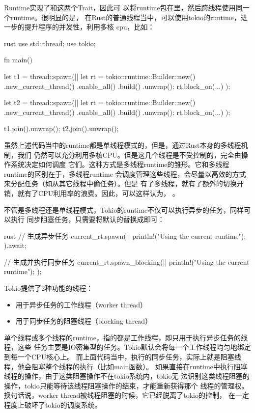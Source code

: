 Runtime实现了和这两个Trait，因此可
以将runtime包在里，然后跨线程使用同一个runtime。很明显的是，
在Rust的普通线程当中，可以使用tokio的runtime，进一步的提升程序的并发性，利用多核
cpu，比如：
\begin{code-block}{rust}
use std::thread;
use tokio;

fn main() {
    let t1 = thread::spawn(|| {
        let rt = tokio::runtime::Builder::new()
            .new_current_thread()
            .enable_all()
            .build()
            .unwrap();
        rt.block_on(...)
    });

    let t2 = thread::spawn(|| {
        let rt = tokio::runtime::Builder::new()
            .new_current_thread()
            .enable_all()
            .build()
            .unwrap();
        rt.block_on(...)
    });

    t1.join().unwrap();
    t2.join().unwrap();
}
\end{code-block}
虽然上述代码当中的runtime都是单线程模式的，但是，通过Rust本身的多线程机制，我们
仍然可以充分利用多核CPU。但是这几个线程是不受控制的，完全由操作系统决定如何调度
它们。这种方式是多线程runtime的雏形。它和多线程runtime的区别在于，多线程runtime
会调度管理这些线程，会尽量以高效的方式来分配任务（如从其它线程中偷任务）。但是
有了多线程，就有了额外的切换开销，就有了CPU利用率的浪费。因此，可以这样认为，
。

不管是多线程还是单线程模式，Tokio的runtime不仅可以执行异步的任务，同样可以执行
同步阻塞任务，只需要将默认的替换成即可：
\begin{code-block}{rust}
// 生成异步任务
current_rt.spawn(||{
    println!("Using the current runtime");
}).await;

// 生成并执行同步任务
current_rt.spawn_blocking(||{
    println!("Using the current runtime");
});
\end{code-block}

Tokio提供了2种功能的线程：
\begin{itemize}
  \item 用于异步任务的工作线程（worker thread）
  \item 用于同步任务的阻塞线程（blocking thread）
\end{itemize}

单个线程或多个线程的runtime，指的都是工作线程，即只用于执行异步任务的线程，这些
任务主要是IO密集型的任务。Tokio默认会将每一个工作线程均匀地绑定到每一个CPU核心上。
而上面代码当中，执行的同步任务，实际上就是阻塞线程，他会阻塞整个线程的执行（比如main函数）。
如果直接在runtime中执行阻塞线程的操作，由于这类阻塞操作不在tokio系统内，tokio无
法识别这类线程阻塞的操作，tokio只能等待该线程阻塞操作的结束，才能重新获得那个
线程的管理权。换句话说，worker thread被线程阻塞的时候，它已经脱离了tokio的控制，
在一定程度上破坏了tokio的调度系统。

